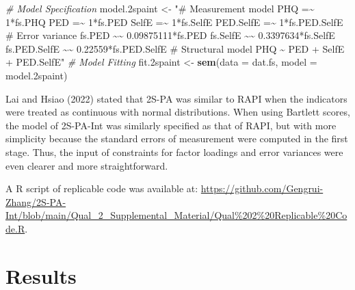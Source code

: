\documentclass[
  man]{apa7}
\newenvironment{Shaded}{\begin{snugshade}}{\end{snugshade}}
\newcommand{\AttributeTok}[1]{\textcolor[rgb]{0.13,0.29,0.53}{#1}}
\newcommand{\CommentTok}[1]{\textcolor[rgb]{0.56,0.35,0.01}{\textit{#1}}}
\newcommand{\FloatTok}[1]{\textcolor[rgb]{0.00,0.00,0.81}{#1}}
\newcommand{\FunctionTok}[1]{\textcolor[rgb]{0.13,0.29,0.53}{\textbf{#1}}}
\newcommand{\NormalTok}[1]{#1}
\newcommand{\OtherTok}[1]{\textcolor[rgb]{0.56,0.35,0.01}{#1}}
\newcommand{\StringTok}[1]{\textcolor[rgb]{0.31,0.60,0.02}{#1}}
\begin{document}
\begin{Shaded}
\begin{Highlighting}[]
\CommentTok{\# Model Specification}
\NormalTok{model}\FloatTok{.2}\NormalTok{spaint }\OtherTok{\textless{}{-}} \StringTok{"\# Measurement model}
\StringTok{                    PHQ =\textasciitilde{} 1*fs.PHQ}
\StringTok{                    PED =\textasciitilde{} 1*fs.PED}
\StringTok{                    SelfE =\textasciitilde{} 1*fs.SelfE}
\StringTok{                    PED.SelfE =\textasciitilde{} 1*fs.PED.SelfE}
\StringTok{                  \# Error variance}
\StringTok{                    fs.PED \textasciitilde{}\textasciitilde{} 0.09875111*fs.PED}
\StringTok{                    fs.SelfE \textasciitilde{}\textasciitilde{} 0.3397634*fs.SelfE}
\StringTok{                    fs.PED.SelfE \textasciitilde{}\textasciitilde{} 0.22559*fs.PED.SelfE}
\StringTok{                  \# Structural model}
\StringTok{                    PHQ \textasciitilde{} PED + SelfE + PED.SelfE"}
\CommentTok{\# Model Fitting}
\NormalTok{fit}\FloatTok{.2}\NormalTok{spaint }\OtherTok{\textless{}{-}} \FunctionTok{sem}\NormalTok{(}\AttributeTok{data =}\NormalTok{ dat.fs, }\AttributeTok{model =}\NormalTok{ model}\FloatTok{.2}\NormalTok{spaint)}
\end{Highlighting}
\end{Shaded}

Lai and Hsiao (2022) stated that 2S-PA was similar to RAPI when the indicators were treated as continuous with normal distributions. When using Bartlett scores, the model of 2S-PA-Int was similarly specified as that of RAPI, but with more simplicity because the standard errors of measurement were computed in the first stage. Thus, the input of constraints for factor loadings and error variances were even clearer and more straightforward.

A R script of replicable code was available at: \url{https://github.com/Gengrui-Zhang/2S-PA-Int/blob/main/Qual_2_Supplemental_Material/Qual\%202\%20Replicable\%20Code.R}.

\hypertarget{results}{%
\section{Results}\label{results}}
\end{document}
